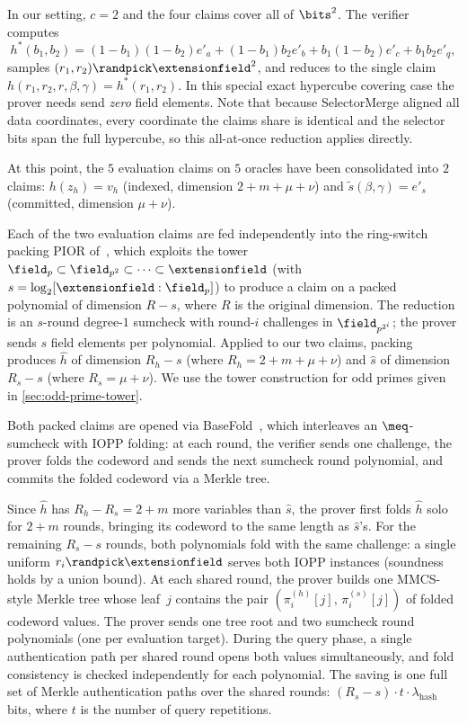 In our setting, $c = 2$ and the four claims cover all of $\bits^2$. The verifier computes
\[
    h^*(b_1, b_2) = (1{-}b_1)(1{-}b_2) e'_a + (1{-}b_1) b_2 e'_b + b_1(1{-}b_2) e'_c + b_1 b_2 e'_q,
\]
samples $(r_1, r_2) \randpick \extensionfield^2$, and reduces to the single claim $h(r_1, r_2, r, \beta, \gamma) = h^*(r_1, r_2)$. In this special exact hypercube covering case the prover needs send \emph{zero} field elements. Note that because SelectorMerge aligned all data coordinates, every coordinate the claims share is identical and the selector bits span the full hypercube, so this all-at-once reduction applies directly.

At this point, the $5$ evaluation claims on $5$ oracles have been consolidated into $2$ claims: $h(z_h) = v_h$ (indexed, dimension $2 + m + \mu + \nu$) and $\tilde{s}(\beta, \gamma) = e'_s$ (committed, dimension $\mu + \nu$).

Each of the two evaluation claims are fed independently into the ring-switch packing PIOR of~\cite{EC:DiaPos25}, which exploits the tower $\field_p \subset \field_{p^2} \subset \cdots \subset \extensionfield$ (with $s = \log_2[\extensionfield:\field_p]$) to produce a claim on a packed polynomial of dimension $R - s$, where $R$ is the original dimension. The reduction is an $s$-round degree-$1$ sumcheck with round-$i$ challenges in $\field_{p^{2^i}}$; the prover sends $s$ field elements per polynomial. Applied to our two claims, packing produces $\hat{h}$ of dimension $R_h - s$ (where $R_h = 2 + m + \mu + \nu$) and $\hat{s}$ of dimension $R_s - s$ (where $R_s = \mu + \nu$). We use the tower construction for odd primes given in \cref{sec:odd-prime-tower}.

Both packed claims are opened via BaseFold~\cite{basefold}, which interleaves an $\meq$-sumcheck with IOPP folding: at each round, the verifier sends one challenge, the prover folds the codeword and sends the next sumcheck round polynomial, and commits the folded codeword via a Merkle tree.

Since $\hat{h}$ has $R_h - R_s = 2 + m$ more variables than $\hat{s}$, the prover first folds $\hat{h}$ solo for $2 + m$ rounds, bringing its codeword to the same length as $\hat{s}$'s. For the remaining $R_s - s$ rounds, both polynomials fold with the same challenge: a single uniform $r_i \randpick \extensionfield$ serves both IOPP instances (soundness holds by a union bound). At each shared round, the prover builds one MMCS-style Merkle tree whose leaf~$j$ contains the pair $(\pi^{(h)}_i[j],\, \pi^{(s)}_i[j])$ of folded codeword values. The prover sends one tree root and two sumcheck round polynomials (one per evaluation target). During the query phase, a single authentication path per shared round opens both values simultaneously, and fold consistency is checked independently for each polynomial.  The saving is one full set of Merkle authentication paths over the shared rounds: $(R_s - s) \cdot t \cdot \lambda_{\mathrm{hash}}$ bits, where $t$ is the number of query repetitions.

